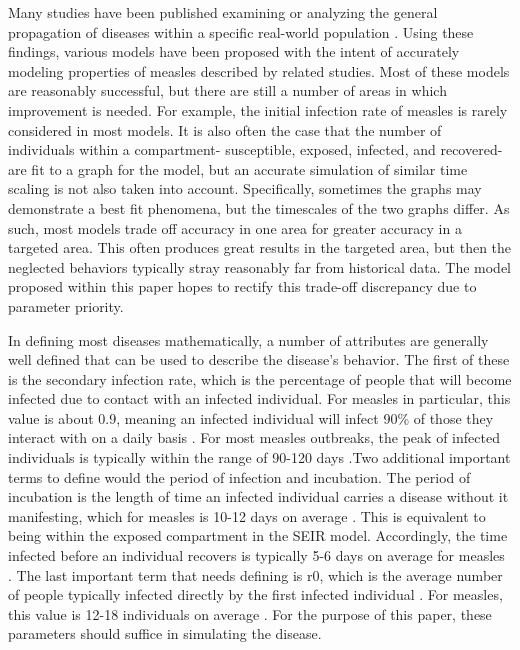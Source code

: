 \documentclass[conference]{IEEEtran}
\begin{document}
Many studies have been published examining or analyzing the general propagation of diseases within a specific real-world population \cite{pinkbookMeasles,measlesIncidence,Jasem2012Elsevier,Mcbrein2003,Sugarman2010}. Using these findings, various models have been proposed with the intent of accurately modeling properties of measles described by related studies. Most of these models are reasonably successful, but there are still a number of areas in which improvement is needed. For example, the initial infection rate of measles is rarely considered in most models. It is also often the case that the number of individuals within a compartment- susceptible, exposed, infected, and recovered-are fit to a graph for the model, but an accurate simulation of similar time scaling is not also taken into account. Specifically, sometimes the graphs may demonstrate a best fit phenomena, but the timescales of the two graphs differ. As such, most models trade off accuracy in one area for greater accuracy in a targeted area. This often produces great results in the targeted area, but then the neglected behaviors typically stray reasonably far from historical data. The model proposed within this paper hopes to rectify this trade-off discrepancy due to parameter priority. \par
In defining most diseases mathematically, a number of attributes are generally well defined that can be used to describe the disease's behavior. The first of these is the secondary infection rate, which is the percentage of people that will become infected due to contact with an infected individual. For measles in particular, this value is about 0.9, meaning an infected individual will infect 90\% of those they interact with on a daily basis \cite{pinkbookMeasles}. For most measles outbreaks, the peak of infected individuals is typically within the range of 90-120 days \cite{pinkbookMeasles}.Two additional important terms to define would the period of infection and incubation. The period of incubation is the length of time an infected individual carries a disease without it manifesting, which for measles is 10-12 days on average \cite{pinkbookMeasles}. This is equivalent to being within the exposed compartment in the SEIR model. Accordingly, the time infected before an individual recovers is typically 5-6 days on average for measles \cite{pinkbookMeasles}. The last important term that needs defining is r0, which is the average number of people typically infected directly by the first infected individual \cite{JamesR0}. For measles, this value is 12-18 individuals on average \cite{pinkbookMeasles}. For the purpose of this paper, these parameters should suffice in simulating the disease. 
\end{document}
